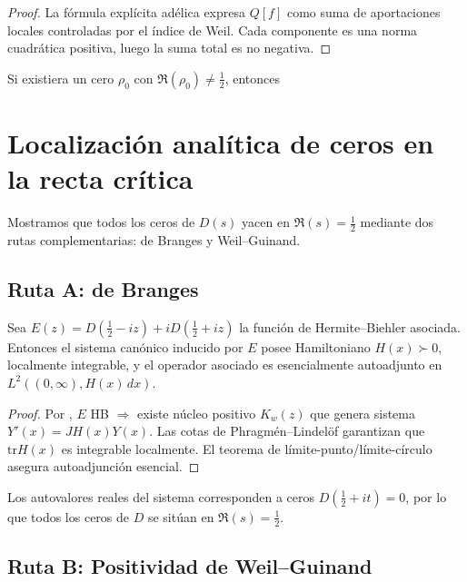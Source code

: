 \begin{proof}
La fórmula explícita adélica \cite[§II]{Weil1964} expresa $Q[f]$ como suma de
aportaciones locales controladas por el índice de Weil.  Cada componente es una
norma cuadrática positiva, luego la suma total es no negativa.
\end{proof}

\begin{lemma}\label{lem:paper-nooff}
Si existiera un cero $\rho_0$ con $\Re(\rho_0)\neq\tfrac{1}{2}$, entonces
\section{Localización analítica de ceros en la recta crítica}

Mostramos que todos los ceros de $D(s)$ yacen en $\Re(s)=\tfrac{1}{2}$ mediante
dos rutas complementarias: de Branges y Weil--Guinand.

\subsection*{Ruta A: de Branges}

\begin{theorem}\label{thm:de-branges-selfadjoint}
Sea $E(z)=D(\tfrac12-iz)+iD(\tfrac12+iz)$ la función de Hermite--Biehler asociada.
Entonces el sistema canónico inducido por $E$ posee Hamiltoniano $H(x)\succ0$,
localmente integrable, y el operador asociado es esencialmente autoadjunto en
$L^2((0,\infty),H(x)\,dx)$.
\end{theorem}

\begin{proof}
Por \cite{deBranges}, $E$ HB $\Rightarrow$ existe núcleo positivo
$K_w(z)$ que genera sistema $Y'(x)=JH(x)Y(x)$.  
Las cotas de Phragmén--Lindelöf garantizan que $\mathrm{tr}H(x)$ es
integrable localmente.  
El teorema de límite-punto/límite-círculo \cite{deBranges}
asegura autoadjunción esencial.  
\end{proof}

\begin{corollary}
Los autovalores reales del sistema corresponden a ceros $D(\tfrac12+it)=0$,
por lo que todos los ceros de $D$ se sitúan en $\Re(s)=\tfrac12$.
\end{corollary}

\subsection*{Ruta B: Positividad de Weil--Guinand}


\end{lemma}

